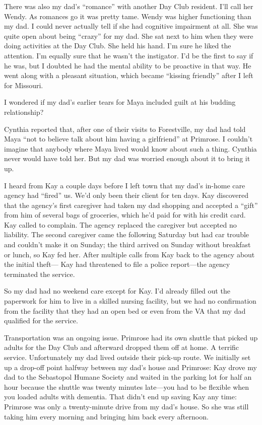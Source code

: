 \documentclass[12pt]{book}
\begin{document}
There was also my dad's ``romance'' with another Day Club resident. I'll call her Wendy. As romances go it was pretty tame. Wendy was higher functioning than my dad. I could never actually tell if she had cognitive impairment at all. She was quite open about being ``crazy'' for my dad. She sat next to him when they were doing activities at the Day Club. She held his hand. I'm sure he liked the attention. I'm equally sure that he wasn't the instigator. I'd be the first to say if he was, but I doubted he had the mental ability to be proactive in that way. He went along with a pleasant situation, which became ``kissing friendly'' after I left for Missouri.

I wondered if my dad's earlier tears for Maya included guilt at his budding relationship?

Cynthia reported that, after one of their visits to Forestville, my dad had told Maya ``not to believe talk about him having a girlfriend'' at Primrose. I couldn't imagine that anybody where Maya lived would know about such a thing. Cynthia never would have told her. But my dad was worried enough about it to bring it up.

I heard from Kay a couple days before I left town that my dad's in-home care agency had ``fired'' us. We'd only been their client for ten days. Kay discovered that the agency's first caregiver had taken my dad shopping and accepted a ``gift'' from him of several bags of groceries, which he'd paid for with his credit card. Kay called to complain. The agency replaced the caregiver but accepted no liability. The second caregiver came the following Saturday but had car trouble and couldn't make it on Sunday; the third arrived on Sunday without breakfast or lunch, so Kay fed her. After multiple calls from Kay back to the agency about the initial theft--- Kay had threatened to file a police report---the agency terminated the service.

So my dad had no weekend care except for Kay. I'd already filled out the paperwork for him to live in a skilled nursing facility, but we had no confirmation from the facility that they had an open bed or even from the VA that my dad qualified for the service.

Transportation was an ongoing issue. Primrose had its own shuttle that picked up adults for the Day Club and afterward dropped them off at home. A terrific service. Unfortunately my dad lived outside their pick-up route. We initially set up a drop-off point halfway between my dad's house and Primrose: Kay drove my dad to the Sebastopol Humane Society and waited in the parking lot for half an hour because the shuttle was twenty minutes late---you had to be flexible when you loaded adults with dementia. That didn't end up saving Kay any time: Primrose was only a twenty-minute drive from my dad's house. So she was still taking him every morning and bringing him back every afternoon.
\end{document}
